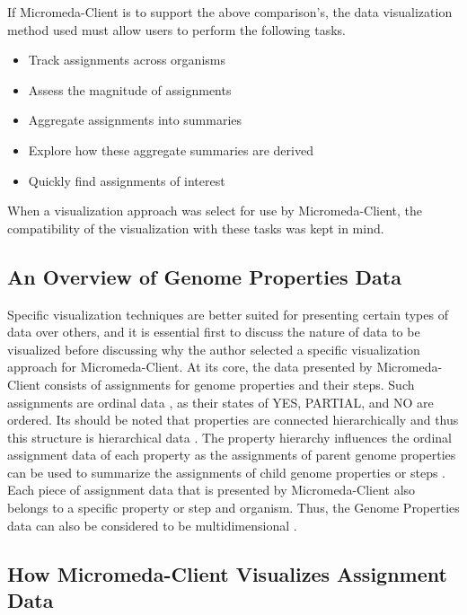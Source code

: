 If Micromeda-Client is to support the above comparison's, the data visualization method used must allow users to perform the following tasks.

\begin{itemize}
\item Track assignments across organisms
\item Assess the magnitude of assignments
\item Aggregate assignments into summaries
\item Explore how these aggregate summaries are derived
\item Quickly find assignments of interest
\end{itemize}

When a visualization approach was select for use by Micromeda-Client, the compatibility of the visualization with these tasks was kept in mind.

\subsection{An Overview of Genome Properties Data}

Specific visualization techniques are better suited for presenting certain types of data over others, and it is essential first to discuss the nature of data to be visualized before discussing why the author selected a specific visualization approach for Micromeda-Client. At its core, the data presented by Micromeda-Client consists of assignments for genome properties and their steps. Such assignments are ordinal data \cite{richardson2018genome,agresti2010analysis}, as their states of YES, PARTIAL, and NO are ordered. Its should be noted that properties are connected hierarchically \cite{richardson2018genome} and thus this structure is hierarchical data \cite{richardson2018genome,samet1990applications}. The property hierarchy influences the ordinal assignment data of each property as the assignments of parent genome properties can be used to summarize the assignments of child genome properties or steps \cite{richardson2018genome}. Each piece of assignment data that is presented by Micromeda-Client also belongs to a specific property or step and organism. Thus, the Genome Properties data can also be considered to be multidimensional \cite{pedersen1999multidimensional}.

\subsection{How Micromeda-Client Visualizes Assignment Data}

